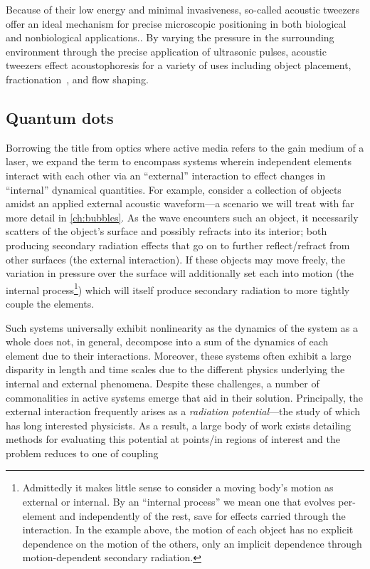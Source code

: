 Because of their low energy and minimal invasiveness, so-called acoustic tweezers offer an ideal mechanism for precise microscopic positioning in both biological and nonbiological applications..
By varying the pressure in the surrounding environment through the precise application of ultrasonic pulses, acoustic tweezers effect acoustophoresis for a variety of uses including object placement, fractionation~\cite{Petersson2007}, and flow shaping.



\subsection{Quantum dots}


Borrowing the title from optics where active media refers to the gain medium of a laser, we expand the term to encompass systems wherein independent elements interact with each other via an ``external'' interaction to effect changes in ``internal'' dynamical quantities.
For example, consider a collection of objects amidst an applied external acoustic waveform---a scenario we will treat with far more detail in \cref{ch:bubbles}.
As the wave encounters such an object, it necessarily scatters of the object's surface and possibly refracts into its interior; both producing secondary radiation effects that go on to further reflect/refract from other surfaces (the external interaction).
If these objects may move freely, the variation in pressure over the surface will additionally set each into motion (the internal process\footnote{Admittedly it makes little sense to consider a moving body's motion as external or internal. By an ``internal process'' we mean one that evolves per-element and independently of the rest, save for effects carried through the interaction. In the example above, the motion of each object has no explicit dependence on the motion of the others, only an implicit dependence through motion-dependent secondary radiation.}) which will itself produce secondary radiation to more tightly couple the elements.

Such systems universally exhibit nonlinearity as the dynamics of the system as a whole does not, in general, decompose into a sum of the dynamics of each element due to their interactions.
Moreover, these systems often exhibit a large disparity in length and time scales due to the different physics underlying the internal and external phenomena.
Despite these challenges, a number of commonalities in active systems emerge that aid in their solution.
Principally, the external interaction frequently arises as a \emph{radiation potential}---the study of which has long interested physicists.
As a result, a large body of work exists detailing methods for evaluating this potential at points/in regions of interest and the problem reduces to one of coupling

